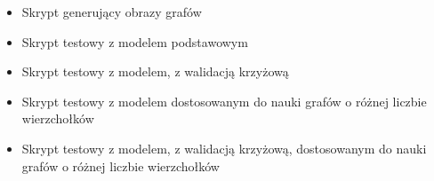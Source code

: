 
\begin{itemize}[label=-,labelsep=0.4cm,leftmargin=0.6cm]
    \item Skrypt generujący obrazy grafów
    \item Skrypt testowy z modelem podstawowym
    \item Skrypt testowy z modelem, z walidacją krzyżową
    \item Skrypt testowy z modelem dostosowanym do nauki grafów o różnej liczbie wierzchołków
    \item Skrypt testowy z modelem, z walidacją krzyżową, dostosowanym do nauki grafów o różnej liczbie wierzchołków
\end{itemize}
